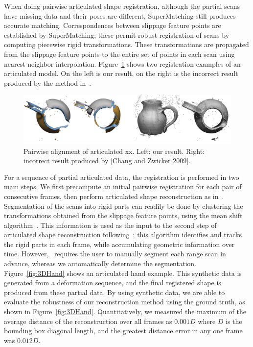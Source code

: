 When doing pairwise articulated shape registration,
although the partial scans have missing data and their poses are different, SuperMatching still produces accurate matching.
Correspondences between slippage feature points are established by SuperMatching;
these permit robust registration of scans by computing piecewise rigid transformations.
These transformations are propagated from the slippage feature points to the entire set of points in each scan using nearest neighbor interpolation.
Figure~\ref{fig:3DRobot} shows two registration examples of an articulated model. On the left is our result, on the right is the  incorrect result produced by the method in~\cite{Chang09}.

\begin{figure}[h]
\centering
  \includegraphics[width=0.99\linewidth]{figures/rigidCMP.jpg}
  \caption{Pairwise alignment of articulated xx. Left: our result. Right: incorrect result produced by [Chang and Zwicker 2009].}
\label{fig:3DRobot}
\end{figure}

For a sequence of partial articulated data, the registration is performed in two main steps.
We first precompute an initial pairwise registration for each pair of consecutive frames, then perform articulated shape reconstruction as in~\cite{Pekelny08}.
Segmentation of the scans into rigid parts can readily be done by clustering the transformations obtained from the slippage feature points,
using the mean shift algorithm~\cite{Comaniciu02}.
This information is used as the input to the second step of articulated shape reconstruction following~\cite{Pekelny08};
this algorithm identifies and tracks the rigid parts in each frame, while accumulating  geometric information over time.
However,~\cite{Pekelny08} requires the user to manually segment each range scan in advance,  whereas we automatically determine  the segmentation.
Figure~\ref{fig:3DHand} shows an articulated hand example.
This synthetic data is generated from a deformation sequence, and the final registered shape is produced from these partial data.
By using synthetic data, we are able to evaluate the robustness of our reconstruction method using the ground truth, as shown in Figure~\ref{fig:3DHand}.
Quantitatively, we measured the maximum of the average distance of the reconstruction over all frames as $0.001 D$ where $D$ is the bounding box diagonal length, and
the greatest distance error in any one frame was $0.012 D$.

